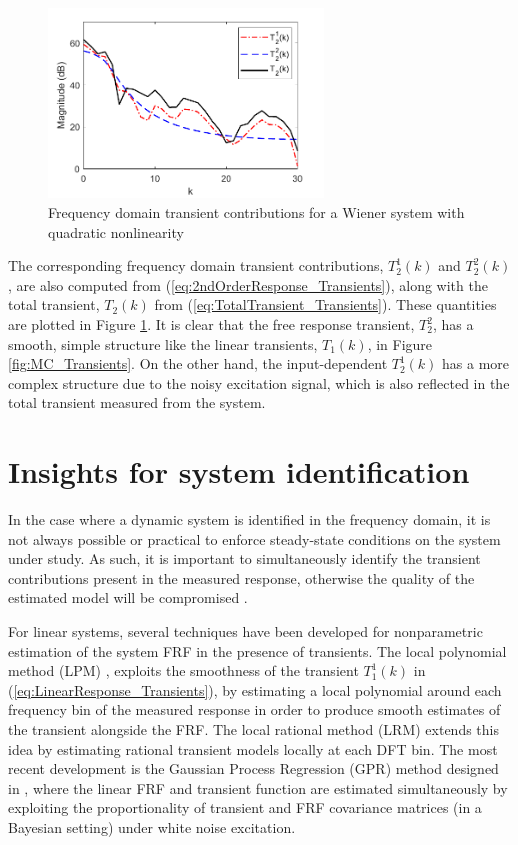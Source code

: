 \begin{figure}[!h]
\centering
\includegraphics[width=0.65\textwidth]{Chapter9_NonlinTransients/T_2_dB.pdf}
\caption{Frequency domain transient contributions for a Wiener system with quadratic nonlinearity}
\label{fig:T_2_dB}
\end{figure}

The corresponding frequency domain transient contributions, $T_2^1(k)$ and $T_2^2(k)$, are also computed from (\ref{eq:2ndOrderResponse_Transients}), along with the total transient, $T_2(k)$ from (\ref{eq:TotalTransient_Transients}). These quantities are plotted in Figure \ref{fig:T_2_dB}. It is clear that the free response transient, $T_2^2$, has a smooth, simple structure like the linear transients, $T_1(k)$, in Figure \ref{fig:MC_Transients}. On the other hand, the input-dependent $T_2^1(k)$ has a more complex structure due to the noisy excitation signal, which is also reflected in the total transient measured from the system.

\section{Insights for system identification}

In the case where a dynamic system is identified in the frequency domain, it is not always possible or practical to enforce steady-state conditions on the system under study. As such, it is important to simultaneously identify the transient contributions present in the measured response, otherwise the quality of the estimated model will be compromised \cite{Pintelon1997}. 

For linear systems, several techniques have been developed for nonparametric estimation of the system FRF in the presence of transients. The local polynomial method (LPM) \cite{Pintelon2012}, \cite{Schoukens2009} exploits the smoothness of the transient $T_1^1(k)$ in (\ref{eq:LinearResponse_Transients}), by estimating a local polynomial around each frequency bin of the measured response in order to produce smooth estimates of the transient alongside the FRF. The local rational method (LRM) \cite{McKelvey2012} extends this idea by estimating rational transient models locally at each DFT bin. The most recent development is the Gaussian Process Regression (GPR) method designed in \cite{Lataire2016}, where the linear FRF and transient function are estimated simultaneously by exploiting the proportionality of transient and FRF covariance matrices (in a Bayesian setting) under white noise excitation. 

